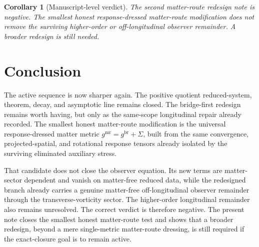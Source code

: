 \documentclass[11pt]{article}
\newcommand{\MatterMetric}{g^{\mathrm{mr}}}
\newcommand{\SigmaMR}{\Sigma}
\newtheorem{corollary}{Corollary}
\begin{document}
\begin{corollary}[Manuscript-level verdict]
\label{cor:verdict}
The second matter-route redesign note is negative. The smallest honest response-dressed matter-route modification does not remove the surviving higher-order or off-longitudinal observer remainder. A broader redesign is still needed.
\end{corollary}

\section{Conclusion}

The active sequence is now sharper again. The positive quotient reduced-system, theorem, decay, and asymptotic line remains closed. The bridge-first redesign remains worth having, but only as the same-scope longitudinal repair already recorded. The smallest honest matter-route modification is the universal response-dressed matter metric \(\MatterMetric=g^{\mathrm{br}}+\SigmaMR\), built from the same convergence, projected-spatial, and rotational response tensors already isolated by the surviving eliminated auxiliary stress.

That candidate does not close the observer equation. Its new terms are matter-sector dependent and vanish on matter-free reduced data, while the redesigned branch already carries a genuine matter-free off-longitudinal observer remainder through the transverse-vorticity sector. The higher-order longitudinal remainder also remains unresolved. The correct verdict is therefore negative. The present note closes the smallest honest matter-route test and shows that a broader redesign, beyond a mere single-metric matter-route dressing, is still required if the exact-closure goal is to remain active.
\end{document}
